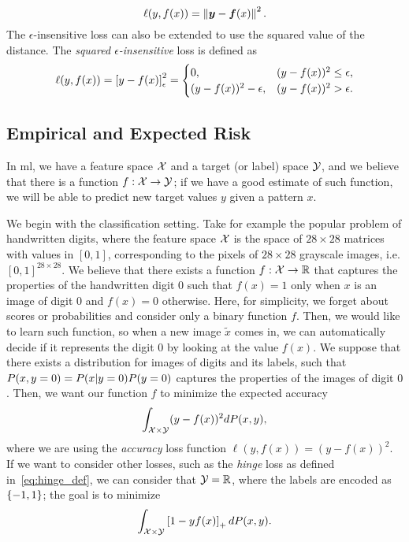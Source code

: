 \begin{equation}
    \label{eq:sqmulti_def}
    \lossf(y, f(x)) =  \norm{\fv{y} - \fv{f}(x)}^2.
\end{equation}
%
The $\epsilon$-insensitive loss can also be extended to use the squared value of the distance. The \emph{squared $\epsilon$-insensitive} loss is defined as
\begin{equation}
    \label{eq:sqepsins_def}
    \lossf(y, f(x)) = \epsins{y - f(x)}^2 =
    \begin{cases}
        0, & (y - f(x))^2 \leq \epsilon ,\\
        (y - f(x))^2 - \epsilon, & (y - f(x))^2 > \epsilon .\\
    \end{cases}
\end{equation} 

\subsection{Empirical and Expected Risk} 
In \acrshort{ml}, we have a feature space $\mathcal{X}$ and a target (or label) space $\mathcal{Y}$, and we believe that there is a function $f: \mathcal{X} \to \mathcal{Y}$; if we have a good estimate of such function, we will be able to predict new target values $y$ given a pattern $x$. 

%
We begin with the classification setting. Take for example the popular problem  of handwritten digits, where the feature space $\mathcal{X}$ is the space of $28 \times 28$ matrices with values in $[0, 1]$, corresponding to the pixels of $28 \times 28$ grayscale images, i.e. $[0, 1]^{28 \times 28}$. We believe that there exists a function $f: \mathcal{X} \to \mathbb{R}$ that captures the properties of the handwritten digit $0$ such that $f(x)=1$ only when $x$ is an image of digit $0$ and $f(x)=0$ otherwise. 
Here, for simplicity, we forget about scores or probabilities and consider only a binary function $f$.
Then, we would like to learn such function, so when a new image $\tilde{x}$ comes in, we can automatically decide if it represents the digit $0$ by looking at the value $f(x)$.
%
We suppose that there exists a distribution for images of digits and its labels, such that $P(x, y=0) = P(x \vert y = 0) P(y = 0)$ captures the properties of the images of digit $0$. Then, we want our function $f$ to minimize the expected accuracy
$$ \int_{\mathcal{X} \times \mathcal{Y}} (y - f(x))^2 dP(x, y) ,$$
where we are using the \emph{accuracy} loss function $\ell(y, f(x)) = (y - f(x))^2$. 
%
If we want to consider other losses, such as the \emph{hinge} loss as defined in~\eqref{eq:hinge_def}, we can consider that $\mathcal{Y} = \mathbb{R}$, where the labels are encoded as $\left\{-1, 1\right\}$; the goal is to minimize 
$$ \int_{\mathcal{X} \times \mathcal{Y}} \left[1 - y f(x)\right]_{+} dP(x, y) .$$

